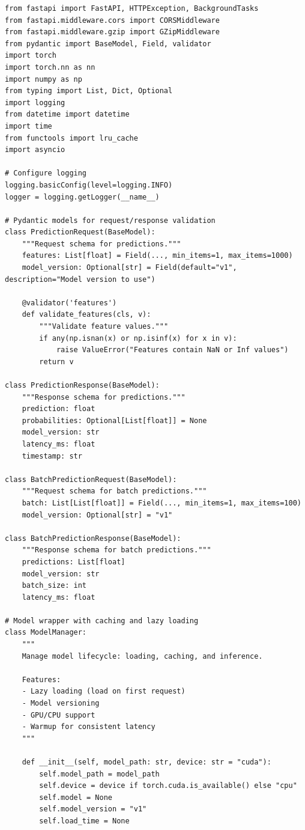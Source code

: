 \begin{lstlisting}[style=python, caption=Production-ready FastAPI model serving]
from fastapi import FastAPI, HTTPException, BackgroundTasks
from fastapi.middleware.cors import CORSMiddleware
from fastapi.middleware.gzip import GZipMiddleware
from pydantic import BaseModel, Field, validator
import torch
import torch.nn as nn
import numpy as np
from typing import List, Dict, Optional
import logging
from datetime import datetime
import time
from functools import lru_cache
import asyncio

# Configure logging
logging.basicConfig(level=logging.INFO)
logger = logging.getLogger(__name__)

# Pydantic models for request/response validation
class PredictionRequest(BaseModel):
    """Request schema for predictions."""
    features: List[float] = Field(..., min_items=1, max_items=1000)
    model_version: Optional[str] = Field(default="v1", description="Model version to use")

    @validator('features')
    def validate_features(cls, v):
        """Validate feature values."""
        if any(np.isnan(x) or np.isinf(x) for x in v):
            raise ValueError("Features contain NaN or Inf values")
        return v

class PredictionResponse(BaseModel):
    """Response schema for predictions."""
    prediction: float
    probabilities: Optional[List[float]] = None
    model_version: str
    latency_ms: float
    timestamp: str

class BatchPredictionRequest(BaseModel):
    """Request schema for batch predictions."""
    batch: List[List[float]] = Field(..., min_items=1, max_items=100)
    model_version: Optional[str] = "v1"

class BatchPredictionResponse(BaseModel):
    """Response schema for batch predictions."""
    predictions: List[float]
    model_version: str
    batch_size: int
    latency_ms: float

# Model wrapper with caching and lazy loading
class ModelManager:
    """
    Manage model lifecycle: loading, caching, and inference.

    Features:
    - Lazy loading (load on first request)
    - Model versioning
    - GPU/CPU support
    - Warmup for consistent latency
    """

    def __init__(self, model_path: str, device: str = "cuda"):
        self.model_path = model_path
        self.device = device if torch.cuda.is_available() else "cpu"
        self.model = None
        self.model_version = "v1"
        self.load_time = None


\end{lstlisting}
